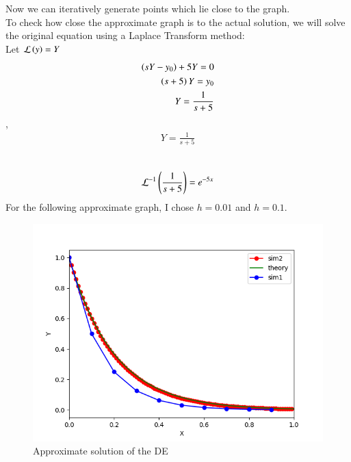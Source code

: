 \documentclass[journal]{IEEEtran}
\begin{document}
Now we can iteratively generate points which lie close to the graph.\\
To check how close the approximate graph is to the actual solution, we will solve the original 
equation using a Laplace Transform method:\\
Let $\mathcal{L}\left(y\right) = Y$\\
\begin{align}
    \left(sY - y_0\right) +5Y = 0\\
    \left(s + 5\right)Y = y_0\\
    Y = \frac{1}{s + 5}\\
\end{align}
    ,\\
\begin{align}
    Y = \frac{1}{s + 5}\\
\end{align}
    \\
\begin{align}
    \mathcal{L}^{-1}\left(\frac{1}{s+5}\right) = e^{-5x}
\end{align}
For the following approximate graph, I chose $h = 0.01$ and $h = 0.1$.
\begin{figure}[h!]
   \centering
   \includegraphics[width=0.7\columnwidth]{figs/fig.png}
    \caption{Approximate solution of the DE}
\end{figure}
\end{document}
